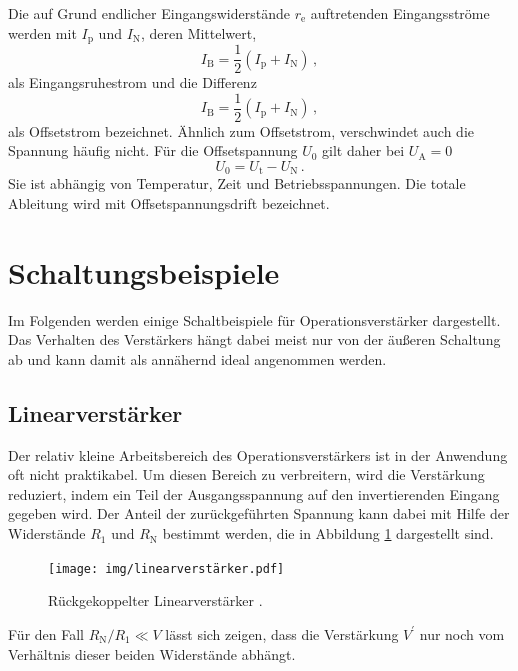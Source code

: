 Die auf Grund endlicher Eingangswiderstände $r_\text{e}$ auftretenden
Eingangsströme werden mit $I_\text{p}$ und $I_\text{N}$, deren
Mittelwert,
\begin{equation}
\label{eq:eingangsruhestrom}
    I_\text{B} = \frac{1}{2}\left(I_\text{p} + I_\text{N}\right)\,,
\end{equation}
als Eingangsruhestrom und die Differenz
\begin{equation}
\label{eq:offsetstrom}
    I_\text{B} = \frac{1}{2}\left(I_\text{p} + I_\text{N}\right)\,,
\end{equation}
als Offsetstrom bezeichnet.
Ähnlich zum Offsetstrom, verschwindet auch die Spannung häufig nicht.
Für die Offsetspannung $U_0$ gilt daher bei $U_\text{A} = 0$
\begin{equation}
\label{eq:offsetspannung}
    U_0 = U_\text{t} - U_\text{N}\,.
\end{equation}
Sie ist abhängig von Temperatur, Zeit und Betriebsspannungen. Die totale
Ableitung wird mit Offsetspannungsdrift bezeichnet.


\section{Schaltungsbeispiele}
\label{sec:schaltungsbeispiele}
Im Folgenden werden einige Schaltbeispiele für Operationsverstärker
dargestellt. Das Verhalten des Verstärkers hängt dabei meist nur von der
äußeren Schaltung ab und kann damit als annähernd ideal angenommen werden.

\subsection{Linearverstärker}
\label{subsec:linearverstärker}
Der relativ kleine Arbeitsbereich des Operationsverstärkers ist in der
Anwendung oft nicht praktikabel. Um diesen Bereich zu verbreitern, wird die
Verstärkung reduziert, indem ein Teil der Ausgangsspannung auf den
invertierenden Eingang gegeben wird.
Der Anteil der zurückgeführten Spannung kann dabei mit Hilfe der Widerstände
$R_1$ und $R_\text{N}$ bestimmt werden, die in Abbildung \ref{fig:linear}
dargestellt sind.
\begin{figure}
    \centering
    \texttt{[image: img/linearverstärker.pdf]}
    \caption{Rückgekoppelter Linearverstärker \cite{V51}.}
    \label{fig:linear}
\end{figure}
Für den Fall $R_\text{N}/R_1 \ll V$
lässt sich zeigen, dass die Verstärkung $V^\prime$ nur noch vom Verhältnis
dieser beiden Widerstände abhängt.

